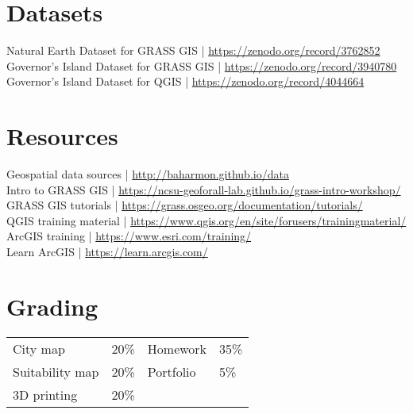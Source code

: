 \documentclass[11pt,article,oneside]{memoir}
\begin{document}
\section{Datasets}
Natural Earth Dataset for GRASS GIS | \url{https://zenodo.org/record/3762852}\\
Governor's Island Dataset for GRASS GIS | \url{https://zenodo.org/record/3940780}\\
Governor's Island Dataset for QGIS | \url{https://zenodo.org/record/4044664}\\

\section{Resources}
Geospatial data sources | \url{http://baharmon.github.io/data}\\
Intro to GRASS GIS | \url{https://ncsu-geoforall-lab.github.io/grass-intro-workshop/}\\
GRASS GIS tutorials | \url{https://grass.osgeo.org/documentation/tutorials/}\\
QGIS training material | \url{https://www.qgis.org/en/site/forusers/trainingmaterial/}\\
ArcGIS training | \url{https://www.esri.com/training/}\\
Learn ArcGIS | \url{https://learn.arcgis.com/}\\

\section{Grading}
\vspace*{-0.4cm}
\begin{table}[H]
\begin{tabular}{@{}l r @{\hskip 2cm} l @{\hskip 0.5cm} l}
City map & 20\% & Homework & 35\% \\
Suitability map & 20\% & Portfolio & 5\% \\
3D printing & 20\% \\
\end{tabular}
\end{table}

\clearpage

\end{document}
